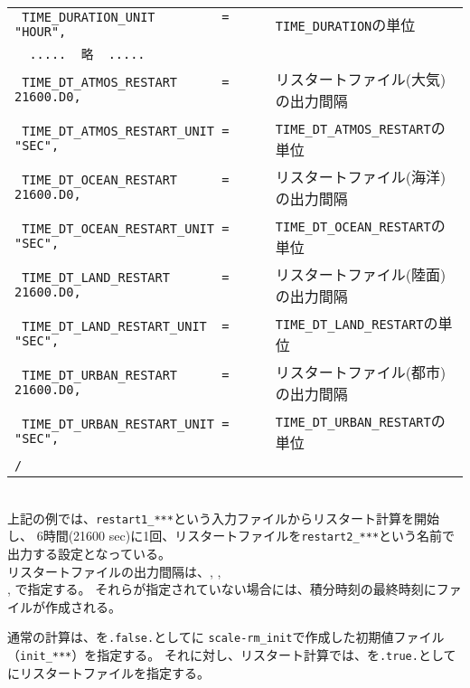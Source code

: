 {{{\begin{tabularx}{150mm}{lX}
\verb| TIME_DURATION_UNIT         = "HOUR",               | & \verb|TIME_DURATION|の単位 \\
\verb|  .....  略  .....                                  | & \\
\verb| TIME_DT_ATMOS_RESTART      = 21600.D0,             | & リスタートファイル(大気)の出力間隔\\
\verb| TIME_DT_ATMOS_RESTART_UNIT = "SEC",                | & \verb|TIME_DT_ATMOS_RESTART|の単位\\
\verb| TIME_DT_OCEAN_RESTART      = 21600.D0,             | & リスタートファイル(海洋)の出力間隔\\
\verb| TIME_DT_OCEAN_RESTART_UNIT = "SEC",                | & \verb|TIME_DT_OCEAN_RESTART|の単位\\
\verb| TIME_DT_LAND_RESTART       = 21600.D0,             | & リスタートファイル(陸面)の出力間隔\\
\verb| TIME_DT_LAND_RESTART_UNIT  = "SEC",                | & \verb|TIME_DT_LAND_RESTART|の単位\\
\verb| TIME_DT_URBAN_RESTART      = 21600.D0,             | & リスタートファイル(都市)の出力間隔\\
\verb| TIME_DT_URBAN_RESTART_UNIT = "SEC",                | & \verb|TIME_DT_URBAN_RESTART|の単位\\
\verb|/| & \\
\end{tabularx}
}}}\\


上記の例では、\verb|restart1_***|という入力ファイルからリスタート計算を開始し、
6時間(21600 sec)に1回、リスタートファイルを\verb|restart2_***|という名前で出力する設定となっている。\\
リスタートファイルの出力間隔は、, , \\
 ,  で指定する。
それらが指定されていない場合には、積分時刻の最終時刻にファイルが作成される。

通常の計算は、を\verb|.false.|としてに
\verb|scale-rm_init|で作成した初期値ファイル（\verb|init_***|）を指定する。
それに対し、リスタート計算では、を\verb|.true.|として
にリスタートファイルを指定する。

